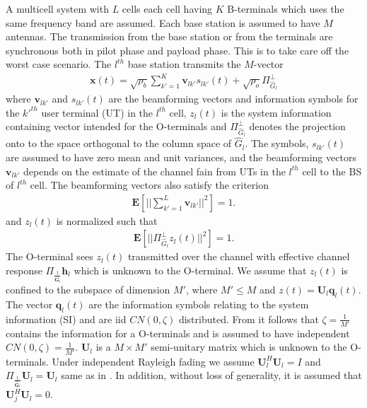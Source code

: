 \documentclass[10pt, a4paper, twoside,fleqn]{article}
\begin{document}
	A multicell system with $L$ cells each cell having $K$ B-terminals which uses the same frequency band are assumed. Each base station is assumed to have $M$ antennas. The transmission from the base station or from the terminals are synchronous both in pilot phase and payload phase. This is to take care off the worst case scenario. The $l^{th}$ base station transmits the $M$-vector
\begin{eqnarray}
	\pmb{x}(t) = \sqrt{\rho_b}\sum\limits_{k'=1}^{K}\boldsymbol{v}_{lk'}s_{lk'}(t)
    		      + \sqrt{\rho_o}\Pi^{\perp}_{{\widehat{G}_l}}
\end{eqnarray}
where $\pmb{v}_{lk'}$ and $s_{lk'}(t)$ are the beamforming vectors and information symbols for the $k'^{th}$ user terminal (UT) in the $l^{th}$ cell, $z_l(t)$ is the system information containing vector intended for the O-terminals and $\Pi^{\perp}_{{\widehat{G}_l}}$ denotes the projection onto to the space orthogonal to the column space of $\hat G_l$. The symbols, $s_{lk'}(t)$ are assumed to have zero mean and unit variances, and the beamforming vectors $\pmb{v}_{lk'}$ depends on the estimate of the channel fain from UTs in the $l^{th}$ cell to the BS of $l^{th}$ cell. 
The beamforming vectors also satisfy the criterion
\begin{eqnarray}
	\pmb{E}\left[||\sum\limits_{k'=1}^{L}\pmb{v}_{lk'}||^2\right]=1.
\end{eqnarray}
and $z_l(t)$ is normalized such that
\begin{eqnarray}\label{eqn:zlcondition}
	\pmb{E}\left[||\Pi^{\perp}_{{\widehat{G}_l}}z_l(t)||^2\right]=1.
\end{eqnarray}
The O-terminal sees $z_l(t)$ transmitted over the channel with effective channel response $\Pi_{\frac{1}{\pmb{\hat G}_l}}\pmb{h}_l$ which is unknown to the O-terminal. We assume that $z_l(t)$ is confined to the subspace of dimension $M'$, where $M'\leq M$ and $z(t) = \pmb{U}_l\pmb{q}_l(t)$. The vector $\pmb{q}_l(t)$ are the information symbols relating to the system information (SI) and are iid $CN(0,\zeta)$ distributed. From \cite{bib:jbb} it follows that $\zeta=\frac{1}{M'}$ contains the information for a O-terminals  and is assumed to have independent $CN(0, \zeta)=\frac{1}{M'}$. $\pmb{U}_l$ is a $M\times M'$ semi-unitary matrix which is unknown to the O-terminals. Under independent Rayleigh fading we assume $\pmb{U}_l^H\pmb{U}_l=I$ and $\Pi_{\frac{1}{\pmb{\hat G}_l}}\pmb{U}_l=\pmb{U}_l$ same as in \cite{bib:jbb}. In addition, without loss of generality, it is assumed that $\pmb{U}_j^H\pmb{U}_l=0$.
\end{document}
